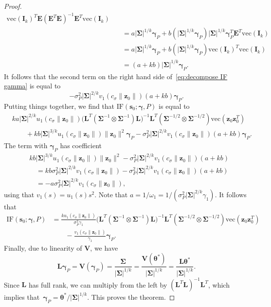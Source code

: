 \documentclass{article}
\numberwithin{equation}{section}
\theoremstyle{plain}
\newcommand{\vc}{\mathrm{vec}}
\newcommand{\btheta}{\bm\theta}
\newcommand{\bgamma}{\bm\gamma}
\newcommand{\bSigma}{\mathbf{\Sigma}}
\newcommand{\bs}{\mathbf{s}}
\newcommand{\bz}{\mathbf{z}}
\newcommand{\bV}{\mathbf{V}}
\newcommand{\bI}{\mathbf{I}}
\newcommand{\bL}{\mathbf{L}}
\newcommand{\bE}{\mathbf{E}}
\begin{document}
\begin{proof}
\[\begin{split}
\vc(\bI_k)^T\bE
(\bE^T\bE)^{-1}
\bE^T
\vc\left(\bI_k\right)\\
&\quad=
a|\bSigma|^{1/k}\bgamma_P
+
b(|\bSigma|^{1/k}\bgamma_P)
|\bSigma|^{1/k}\bgamma_P^T
\bE^T\vc(\bI_k)\\
&\quad=
a|\bSigma|^{1/k}\bgamma_P
+
b(|\bSigma|^{1/k}\bgamma_P)
\vc(\bI_k)^T\vc(\bI_k)\\
&\quad=
(a+kb)
|\bSigma|^{1/k}\bgamma_P.
\end{split}
\]
It follows that the second term on the right hand side of~\eqref{eq:decompose IF gamma} is equal to
\[
-
\sigma_P^2|\bSigma|^{2/k}
v_1\left(c_\sigma\|\bz_0\|\right)
(a+kb)
\bgamma_P.
\]
Putting things together, we find that $\mathrm{IF}(\bs_0;\bgamma,P)$ is equal to
\[
\begin{split}
&
ka
|\bSigma|^{2/k}
u_1\left(c_\sigma\|\bz_0\|\right)
\Big(\bL^T(\bSigma^{-1}\otimes\bSigma^{-1})\bL\Big)^{-1}
\bL^T\left(\bSigma^{-1/2}\otimes\bSigma^{-1/2}\right)
\vc\left(\bz_0\bz_0^T\right)\\
&\qquad+
kb
|\bSigma|^{3/k}
u_1\left(c_\sigma\|\bz_0\|\right)
\|\bz_0\|^2\bgamma_P
-
\sigma_P^2
|\bSigma|^{2/k}
v_1\left(c_\sigma\|\bz_0\|\right)
(a+kb)
\bgamma_P.
\end{split}
\]
The term with $\bgamma_P$ has coefficient
\[
\begin{split}
&
kb
|\bSigma|^{3/k}
u_1\left(c_\sigma\|\bz_0\|\right)
\|\bz_0\|^2
-
\sigma_P^2
|\bSigma|^{2/k}
v_1\left(c_\sigma\|\bz_0\|\right)
(a+kb)\\
&\quad=
kb
\sigma_P^2
|\bSigma|^{2/k}
v_1\left(c_\sigma\|\bz_0\|\right)
-
\sigma_P^2
|\bSigma|^{2/k}
v_1\left(c_\sigma\|\bz_0\|\right)
(a+kb)\\
&\quad=
-
a\sigma_P^2
|\bSigma|^{2/k}
v_1\left(c_\sigma\|\bz_0\|\right),
\end{split}
\]
using that $v_1(s)=u_1(s)s^2$.
Note that
$a=1/\omega_1=1/(\sigma_P^2|\bSigma|^{2/k}\gamma_1)$.
It follows that 
\[
\begin{split}
\mathrm{IF}(\bs_0;\bgamma,P)
&=
\frac{ku_1\left(c_\sigma\|\bz_0\|\right)}{\sigma_P^2\gamma_1}
\Big(\bL^T(\bSigma^{-1}\otimes\bSigma^{-1})\bL\Big)^{-1}
\bL^T\left(\bSigma^{-1/2}\otimes\bSigma^{-1/2}\right)
\vc\left(\bz_0\bz_0^T\right)\\
&\qquad-
\frac{v_1\left(c_\sigma\|\bz_0\|\right)}{\gamma_1}
\bgamma_P.
\end{split}
\]
Finally, due to linearity of $\bV$,
we have 
\begin{equation}
\label{eq:relation gamma theta*}
\bL\bgamma_P
=
\bV(\bgamma_P)
=
\frac{\bSigma}{|\bSigma|^{1/k}}
=
\frac{\bV(\btheta^*)}{|\bSigma|^{1/k}}
=
\frac{\bL\btheta^*}{|\bSigma|^{1/k}}.
\end{equation}
Since $\bL$ has full rank, we can multiply from the left by $(\bL^T\bL)^{-1}\bL^T$,
which implies that~$\bgamma_P=\btheta^*/|\bSigma|^{1/k}$.
This proves the theorem.
\end{proof}
\end{document}
